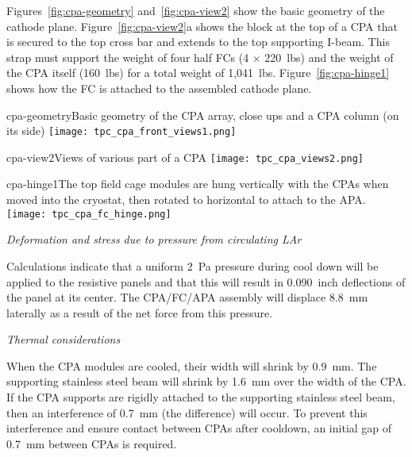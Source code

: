 


Figures~\ref{fig:cpa-geometry} and~\ref{fig:cpa-view2} show the basic geometry of the cathode plane. Figure~\ref{fig:cpa-view2}a shows the block at the top of a CPA that is secured to the top cross bar and extends to the top supporting I-beam.  This strap  must support the weight of four half FCs (4 $\times$ 220~lbs) and the weight of the CPA itself (160~lbs) for a total weight of 1,041~lbs.  Figure~\ref{fig:cpa-hinge1} shows how the FC is attached to the assembled cathode plane. 

\begin{cdrfigure}{cpa-geometry}{Basic geometry of the CPA array, close ups and a CPA column (on its side)} 
\texttt{[image: tpc\_cpa\_front\_views1.png]}
\end{cdrfigure}

\begin{cdrfigure}{cpa-view2}{Views of various part of a CPA} 
\texttt{[image: tpc\_cpa\_views2.png]}
\end{cdrfigure}

\begin{cdrfigure}{cpa-hinge1}{The top field cage modules are hung vertically with the CPAs when moved into the cryostat, then rotated to horizontal to attach to the APA.} 
\texttt{[image: tpc\_cpa\_fc\_hinge.png]}
\end{cdrfigure}


{\it Deformation and stress due to pressure from circulating LAr}

Calculations %
indicate that a uniform 2~Pa pressure during cool down will be
  applied to the resistive panels  and that this will result in 0.090~inch deflections of the panel at its center.  The CPA/FC/APA assembly will displace 8.8~mm laterally as a result of the net force from this pressure.  

{\it Thermal considerations}

When the CPA modules are cooled, their width will shrink by 0.9~mm.  The supporting stainless steel beam will shrink by 1.6~mm over the width of the CPA.  If the CPA supports are rigidly attached to the supporting stainless steel beam, then an interference of 0.7~mm (the difference) will occur.  To prevent this interference and ensure contact between CPAs after cooldown, an initial gap of 0.7~mm between CPAs is required.  

